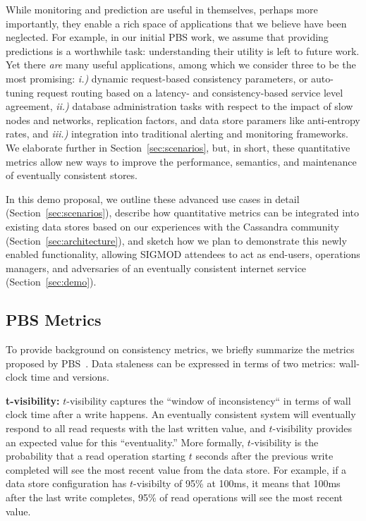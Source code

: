 While monitoring and prediction are useful in themselves, perhaps more
importantly, they enable a rich space of applications that we believe
have been neglected. For example, in our initial PBS work, we assume
that providing predictions is a worthwhile task: understanding their
utility is left to future work. Yet there \textit{are} many useful
applications, among which we consider three to be the most promising:
\textit{i.)} dynamic request-based consistency parameters, or
auto-tuning request routing based on a latency- and consistency-based
service level agreement, \textit{ii.)} database administration tasks
with respect to the impact of slow nodes and networks, replication
factors, and data store paramers like anti-entropy rates, and
\textit{iii.)} integration into traditional alerting and monitoring
frameworks. We elaborate further in Section~\ref{sec:scenarios}, but,
in short, these quantitative metrics allow new ways to improve the
performance, semantics, and maintenance of eventually consistent
stores.

In this demo proposal, we outline these advanced use cases in detail
(Section~\ref{sec:scenarios}), describe how quantitative metrics
can be integrated into existing data stores based on our
experiences with the Cassandra community
(Section~\ref{sec:architecture}), and sketch how we plan to
demonstrate this newly enabled functionality, allowing SIGMOD
attendees to act as end-users, operations managers, and
adversaries of an eventually consistent internet service
(Section~\ref{sec:demo}).

\subsection{PBS Metrics}
To provide background on consistency metrics, we briefly summarize the
metrics proposed by PBS~\cite{pbs-vldb2012}. Data
staleness can be expressed in terms of two metrics: wall-clock time
and versions.

\textbf{t-visibility:} $t$-visibility captures the ``window of
inconsistency`` in terms of wall clock time after a write happens. An
eventually consistent system will eventually respond to all read
requests with the last written value, and $t$-visibility provides an expected
value for this ``eventuality.''  More formally, $t$-visibility is the
probability that a read operation starting $t$ seconds after the
previous write completed will see the most recent value from the data
store. For example, if a data store configuration has $t$-visibilty of
95\% at 100ms, it means that 100ms after the last write completes,
95\% of read operations will see the most recent value.

